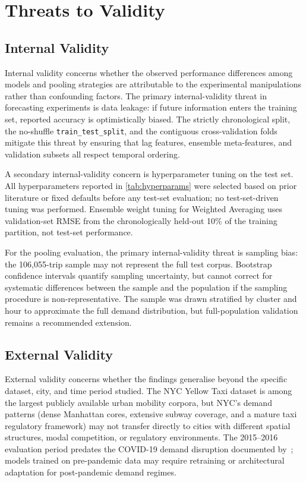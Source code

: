 \section{Threats to Validity}

\subsection{Internal Validity}

Internal validity concerns whether the observed performance differences among models and pooling strategies are attributable to the experimental manipulations rather than confounding factors. The primary internal-validity threat in forecasting experiments is data leakage: if future information enters the training set, reported accuracy is optimistically biased. The strictly chronological split, the no-shuffle \texttt{train\_test\_split}, and the contiguous cross-validation folds mitigate this threat by ensuring that lag features, ensemble meta-features, and validation subsets all respect temporal ordering.

A secondary internal-validity concern is hyperparameter tuning on the test set. All hyperparameters reported in \autoref{tab:hyperparams} were selected based on prior literature or fixed defaults before any test-set evaluation; no test-set-driven tuning was performed. Ensemble weight tuning for Weighted Averaging uses validation-set RMSE from the chronologically held-out 10\% of the training partition, not test-set performance.

For the pooling evaluation, the primary internal-validity threat is sampling bias: the 106,055-trip sample may not represent the full test corpus. Bootstrap confidence intervals quantify sampling uncertainty, but cannot correct for systematic differences between the sample and the population if the sampling procedure is non-representative. The sample was drawn stratified by cluster and hour to approximate the full demand distribution, but full-population validation remains a recommended extension.

\subsection{External Validity}

External validity concerns whether the findings generalise beyond the specific dataset, city, and time period studied. The NYC Yellow Taxi dataset is among the largest publicly available urban mobility corpora, but NYC's demand patterns (dense Manhattan cores, extensive subway coverage, and a mature taxi regulatory framework) may not transfer directly to cities with different spatial structures, modal competition, or regulatory environments. The 2015--2016 evaluation period predates the COVID-19 demand disruption documented by~\parencite{liu2021epidemic}; models trained on pre-pandemic data may require retraining or architectural adaptation for post-pandemic demand regimes.

